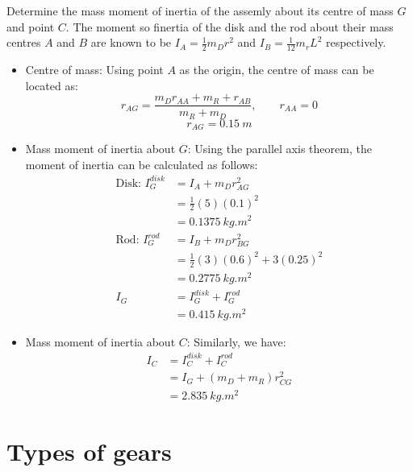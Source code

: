 \documentclass[11pt]{article}
\begin{document}
Determine the mass moment of inertia of the assemly about its centre of mass \(G\) and point \(C\). The moment so finertia of the disk and the rod about their mass centres \(A\) and \(B\) are known to be \(I_A = \frac{1}{2} m_D r^2\) and \(I_B = \frac{1}{12} m_r L^2\) respectively.

\begin{itemize}
\item Centre of mass:
Using point \(A\) as the origin, the centre of mass can be located as:
\[r_{AG} = \frac{m_D r_{AA} + m_R + r_{AB}}{m_R + m_D}, \qquad r_{AA} = 0\]
\[r_{AG} = \qty{0.15}{m}\]

\item Mass moment of inertia about \(G\):
Using the parallel axis theorem, the moment of inertia can be calculated as follows:
\begin{align*}
\text{Disk: } I_G^{disk} &= I_A + m_D r^2_{AG} \\
&= \frac{1}{2} (5) (0.1)^2 \\
&= \qty{0.1375}{kg.m^2} \\
\text{Rod: } I_G^{rod} &= I_B + m_D r^2_{BG} \\
&= \frac{1}{2} (3) (0.6)^2 + 3(0.25)^2 \\
&= \qty{0.2775}{kg.m^2} \\
I_G &= I_G^{disk} + I_G^{rod} \\
&= \qty{0.415}{kg.m^2}
\end{align*}

\item Mass moment of inertia about \(C\):
Similarly, we have:
\begin{align*}
I_C &= I_C^{disk} + I_C^{rod} \\
&= I_G + (m_D + m_R) r_{CG}^2 \\
&= \qty{2.835}{kg.m^2}
\end{align*}
\end{itemize}

 \newpage
\section{Types of gears}
\label{sec:org1d10211}
\end{document}
